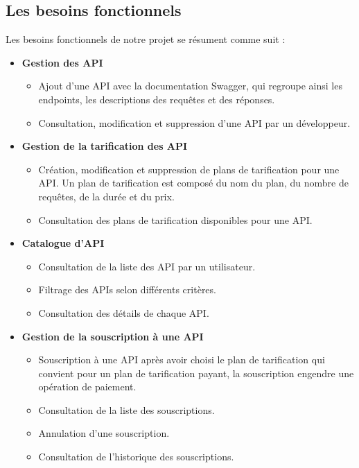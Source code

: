     \subsection{Les besoins fonctionnels } 
    Les besoins fonctionnels de notre projet se résument comme suit :
    \begin{itemize}
        \item  \textbf{Gestion des API}
        \begin{itemize}
            \item Ajout d’une API avec la documentation Swagger, qui regroupe ainsi les endpoints, les descriptions des requêtes et des réponses.
            \item Consultation, modification et suppression d'une API par un développeur. 
        \end{itemize}
        \item \textbf{Gestion de la tarification des API}
        \begin{itemize}
            \item Création, modification et suppression de plans de tarification pour une API. Un plan de tarification est composé du nom du plan, du nombre de requêtes, de la durée et du prix.
            \item Consultation des plans de tarification disponibles pour une API. 
        \end{itemize}
        \item \textbf{Catalogue d’API}
        \begin{itemize}
            \item Consultation de la liste des API par un utilisateur. 
            \item Filtrage des APIs selon différents critères. 
            \item Consultation des détails de chaque API. 
        \end{itemize}
        \item \textbf{Gestion de la souscription à une API}
        \begin{itemize}
            \item Souscription à une API après avoir choisi le plan de tarification qui convient pour un plan de tarification payant, la souscription engendre une opération de paiement. 
            \item Consultation de la liste des souscriptions.  
            \item Annulation d’une souscription. 
            \item Consultation de l'historique des souscriptions.

\end{itemize}
\end{itemize}
